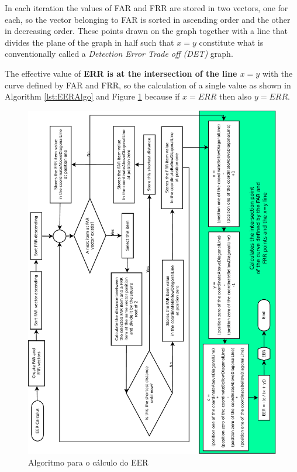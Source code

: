 		\par In each iteration the values of FAR and FRR are stored in two vectors, one for each, so the vector belonging to FAR is sorted in ascending order and the other in decreasing order. These points drawn on the graph together with a line that divides the plane of the graph in half such that $x=y$ constitute what is conventionally called a \textit{Detection Error Trade off (DET)} graph.
		
		\par The effective value of \textbf{ERR is at the intersection of the line $x=y$} with the curve defined by FAR and FRR, so the calculation of a single value as shown in Algorithm \ref{lst:EERAlgo} and Figure \ref{fig:eeralgo} because if $x=ERR$ then also $y=ERR$. \\
		
		
		
		\begin{figure}[H]
			\centering
			\includegraphics[width=.9\linewidth]{images/EERAlgo.pdf}
			\caption{Algoritmo para o cálculo do EER}
			\label{fig:eeralgo}
		\end{figure}

